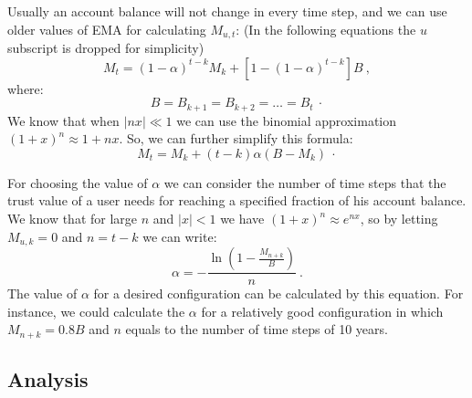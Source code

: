 Usually an account balance will not change in every time step, and we can use older values of EMA for calculating
\(M_{u,t}\): (In the following equations the \(u\) subscript is dropped for simplicity)
\[
    M_{t} = (1 - \alpha)^{t-k}M_{k} + [1 - (1 - \alpha)^{t - k}]B\ ,
\]
where:
\[
    B = B_{k+1} = B_{k+2} = \dots = B_{t}\ \cdot
\]
We know that when \(|nx| \ll 1\) we can use the binomial approximation \({(1 + x)^n \approx 1 + nx}\). So, we can
further simplify this formula:
\[
    M_{t} = M_{k} + (t - k) \alpha (B - M_{k})\ \cdot
\]

For choosing the value of \(\alpha\) we can consider the number of time steps that the trust value of a user needs
for reaching a specified fraction of his account balance. We know that for large \(n\) and \(|x| < 1\) we have
\((1 + x)^n \approx e^{nx}\), so by letting \(M_{u,k} = 0\) and \(n = t - k\) we can write:
\begin{equation}
    \alpha =- \frac{\ln\left(1 - \frac{M_{n+k}}{B}\right)}{n}\ .\label{eq:alpha}
\end{equation}
The value of \(\alpha\) for a desired configuration can be calculated by this equation. For instance, we could
calculate the \(\alpha\) for a relatively good configuration in which \(M_{n+k} = 0.8B\) and \(n\) equals to the
number of time steps of 10 years.

\subsection{Analysis}\label{subsec:consensus-math}
